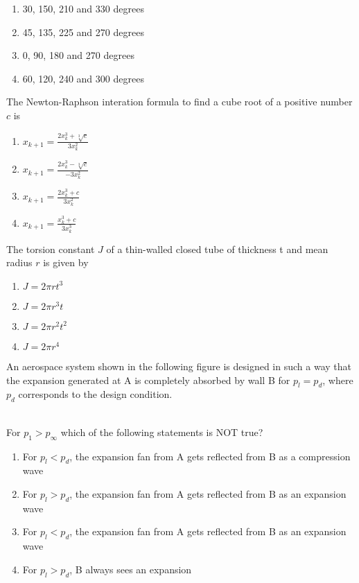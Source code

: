 		\begin{enumerate}
			\item 30, 150, 210 and 330 degrees
			\item 45, 135, 225 and 270 degrees
			\item 0, 90, 180 and 270 degrees
			\item 60, 120, 240 and 300 degrees
		\end{enumerate}
	\item The Newton-Raphson interation formula to find a cube root of a positive number $c$ is
		\begin{enumerate}
			\item $x_{k+1} = \frac{2x_k^3+\sqrt[3]{c}}{3x_k^2}$
			\item $x_{k+1} = \frac{2x_k^3-\sqrt[3]{c}}{-3x_k^2}$
			\item $x_{k+1} = \frac{2x_k^3+{c}}{3x_k^2}$
			\item $x_{k+1} = \frac{x_k^3+{c}}{3x_k^3}$
		\end{enumerate}
	\item The torsion constant $J$ of a thin-walled closed tube of thickness t and mean radius $r$ is given by
		\begin{enumerate}
			\item $J=2\pi rt^3$
			\item $J=2\pi r^3t$
			\item $J=2\pi r^2t^2$
			\item $J=2\pi r^4$
		\end{enumerate}
	\item An aerospace system shown in the following figure is designed in such a way that the expansion generated at A is completely absorbed by wall B for $p_l=p_d$, where $p_d$ corresponds to the design condition.
		\begin{figure}[h!]
			
		\end{figure}\\
		For $p_1>p_{\infty}$ which of the following statements is NOT true?
		\begin{enumerate}
			\item For $p_l<p_d$, the expansion fan from A gets reflected from B as a compression wave
			\item For $p_l>p_d$, the expansion fan from A gets reflected from B as an expansion wave
			\item For $p_l<p_d$, the expansion fan from A gets reflected from B as an expansion wave
			\item For $p_l>p_d$, B always sees an expansion
		\end{enumerate}
